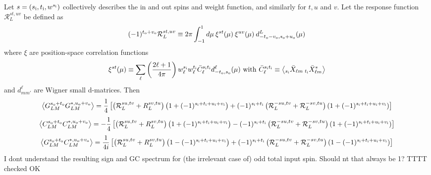 \documentclass[reprint,prd, superscriptaddress, tightenlines, longbibliography, nofootinbib, eqsecnum, amsfonts, amsmath, floatfix, notitlepage, onecolumn]{revtex4-1}
\newcommand{\si}[0]{{s_{\rm i}}}
\newcommand{\ti}[0]{{t_{\rm i}}}
\newcommand{\ui}[0]{{u_{\rm i}}}
\newcommand{\vi}[0]{{v_{\rm i}}}
\newcommand{\so}[0]{{s_{\rm o}}}
\renewcommand{\to}[0]{{t_{\rm o}}}
\newcommand{\uo}[0]{{u_{\rm o}}}
\newcommand{\vo}[0]{{v_{\rm o}}}
\newcommand{\av}[1]{\left\langle #1 \right\rangle}
\newcommand{\JC}[1]{\color{red}#1\color{black}}
\begin{document}
Let $s = (\si, \ti, w^{\si})$ collectively describes the in and out spins and weight function, and similarly for $t, u$ and $v$. Let the response function $\mathcal R^{st, uv}_L$ be defined as
\begin{equation}
(-1)^{\to + \vo} \mathcal R_L^{st,uv} \equiv 2\pi  \int_{-1}^1 d \mu \:\xi^{st}(\mu)\:\xi^{uv}(\mu)\: d^L_{-\to - \vo, \so + \uo}(\mu) 
\end{equation}
where $\xi$ are position-space correlation functions
\begin{equation}
\xi^{st}(\mu) \equiv  \sum_\ell \left(\frac{2\ell + 1}{4\pi}\right)w^\si_\ell w^\ti_\ell \bar C_\ell^{\si \ti} d^\ell_{-\to,\so}(\mu)\textrm{ with } \bar C_\ell^{\si \ti} \equiv \av{ _{\si}\bar X_{\ell m}\: _{\ti} \bar X^*_{\ell m} }
\end{equation}
and $d^\ell_{mm'}$ are Wigner small d-matrices.
Then
\begin{equation}
	\av{G^{\so + \to}_{LM} G^{*, \uo + \vo}_{L M} } = \frac 14\left[ \left(\mathcal R^{su, tv}_L  + R^{sv, tu}_L\right)\left(1 + (-1)^{\si + \ti + \ui + \vi} \right)  + (-1)^{\si + \ti} \left(\mathcal R^{-su, tv}_L + \mathcal R_L^{-sv, tu} \right)(1 + (-1)^{\si + \ti + \ui + \vi}) \right]
\end{equation}
\begin{equation}
	\av{C^{\so + \to}_{LM} C^{*, \uo + \vo}_{L M} } =- \frac 14\left[ \left(\mathcal R^{su, tv}_L  + R^{sv, tu}_L\right)\left(1 + (-1)^{\si + \ti + \ui + \vi} \right)  - (-1)^{\si + \ti} \left(\mathcal R^{-su, tv}_L + \mathcal R_L^{-sv, tu} \right)(1 + (-1)^{\si + \ti + \ui + \vi}) \right]
\end{equation}
\begin{equation}
	\av{G^{\so + \to}_{LM} C^{*, \uo + \vo}_{L M} } = \frac 1{4i}\left[ \left(\mathcal R^{su, tv}_L  + R^{sv, tu}_L\right)\left(1 - (-1)^{\si + \ti + \ui + \vi} \right)  +(-1)^{\si + \ti} \left(\mathcal R^{-su, tv}_L + \mathcal R_L^{-sv, tu} \right)(1 - (-1)^{\si + \ti + \ui + \vi}) \right]
\end{equation}
\JC{I dont understand the resulting sign and GC spectrum for (the irrelevant case of) odd total input spin. Should nt that always be 1? TTTT checked OK}
\end{document}
